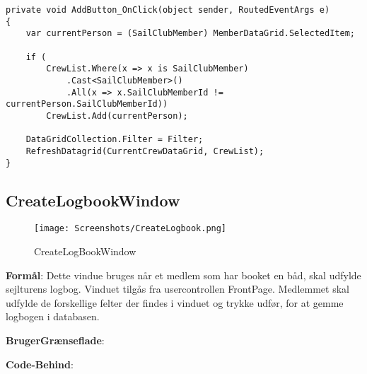 \begin{lstlisting}[frame=single, caption=Add Member, label=AddMember]
private void AddButton_OnClick(object sender, RoutedEventArgs e)
{
    var currentPerson = (SailClubMember) MemberDataGrid.SelectedItem;

    if (
        CrewList.Where(x => x is SailClubMember)
            .Cast<SailClubMember>()
            .All(x => x.SailClubMemberId != currentPerson.SailClubMemberId))
        CrewList.Add(currentPerson);

    DataGridCollection.Filter = Filter; 
    RefreshDatagrid(CurrentCrewDataGrid, CrewList);
}
\end{lstlisting}

\subsection{CreateLogbookWindow}

\begin{wrapfigure}{r}{0.5\textwidth}
    \label{img:login_interface}
    \vspace{-20pt}
    \begin{center}
        \texttt{[image: Screenshots/CreateLogbook.png]}
    \end{center}
    \vspace{-15pt}
    \caption{CreateLogBookWindow}
    \vspace{-30pt}
\end{wrapfigure}

\textbf{Formål}: Dette vindue bruges når et medlem som har booket en båd, skal udfylde sejlturens logbog. Vinduet tilgås fra usercontrollen FrontPage. Medlemmet skal udfylde de forskellige felter der findes i vinduet og trykke udfør, for at gemme logbogen i databasen.

\textbf{BrugerGrænseflade}: 

\textbf{Code-Behind}:



